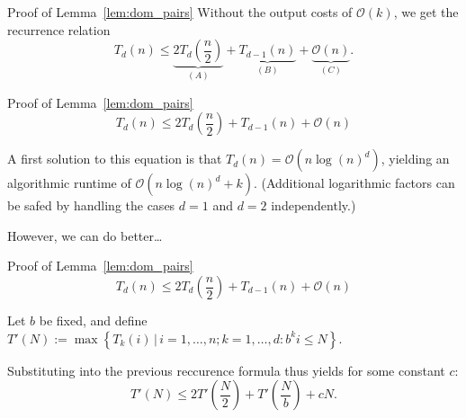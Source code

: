 \begin{frame}{Proof of Lemma~\ref{lem:dom_pairs}}
    Without the output costs of $\mathcal{O}\left( k \right)$, we get the recurrence relation
    \[
        T_d(n) \leq \underbrace{2 T_d\left( \frac{n}{2} \right)}_{(A)} + \underbrace{T_{d - 1}(n)}_{(B)} + \underbrace{\mathcal{O}(n)}_{(C)}.
    \]



\end{frame}

\begin{frame}{Proof of Lemma~\ref{lem:dom_pairs}}
    \[
        T_d(n) \leq 2 T_d\left( \frac{n}{2} \right) + T_{d - 1}(n) + \mathcal{O}(n)
    \]

    A first solution to this equation is that $T_d(n) = \mathcal{O}\left( n {\log(n)}^d \right)$, yielding an algorithmic runtime of $\mathcal{O}\left( n {\log(n)}^d + k \right)$. (Additional logarithmic factors can be safed by handling the cases $d = 1$ and $d = 2$ independently.\footnotemark[1]{})

    However, we can do better\dots
\end{frame}

\begin{frame}{Proof of Lemma~\ref{lem:dom_pairs}}
    \[
        T_d(n) \leq 2 T_d\left( \frac{n}{2} \right) + T_{d - 1}(n) + \mathcal{O}(n)
    \]

    Let $b$ be fixed, and define $T'(N) := \max \left\{ T_k(i) \,|\, i = 1, \dots, n; k = 1, \dots, d: b^k i \leq N \right\}$.
    
    Substituting into the previous reccurence formula thus yields for some constant $c$:
    \[
        T'(N) \leq 2 T'\left( \frac{N}{2} \right) + T'\left( \frac{N}{b} \right) + cN.
    \]
    
\end{frame}


